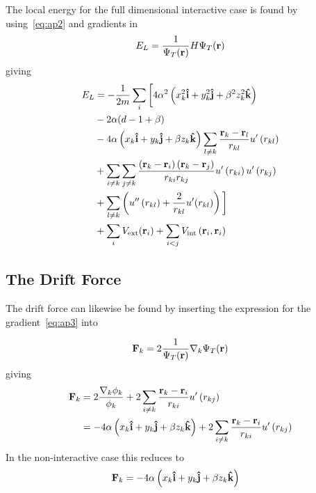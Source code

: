 The local energy for the full dimensional interactive case is found by
using~\eqref{eq:ap2} and gradients in
\begin{align*}
  E_{L} = \frac{1}{\Psi_T(\vb{r})}H\Psi_T(\vb{r})
\end{align*}
giving
\begin{align*}
  E_{L} &= -\frac{1}{2m}\sum_{i}\bigg[4\alpha^{2}\left(  x_{k}^{2}\uvec{i} + y_{k}^{2}\uvec{j} + \beta^{2} z_{k}^{2}\uvec{k}  \right)\\
          &-2\alpha(d-1+\beta)\\
        &- 4\alpha\left(  x_{k}\uvec{i} + y_{k}\uvec{j} + \beta z_{k}\uvec{k}  \right)
          \sum_{l\neq k} \frac{\vb{r}_{k}-\vb{r}_{l}}{r_{kl}}u^{\prime}\left( r_{kl} \right)\\
        &+ \sum_{i\neq k}\sum_{j\neq k}\frac{\left( \vb{r}_{k}-\vb{r}_{i} \right)\left( \vb{r}_{k} -\vb{r}_{j} \right)}{r_{ki}r_{kj}}u^{\prime}\left( r_{ki} \right)u^{\prime}\left( r_{kj} \right)\\
        &+ \sum_{l\neq k} \left( u^{\prime\prime}\left( r_{kl} \right)  + \frac{2}{r_{kl}}u^{\prime}(r_{kl})\right)\bigg]\\
        &+ \sum_{i}V_{\text{ext}}(\vb{r}_{i}) + \sum_{i<j}V_{\text{int}}\left( \vb{r}_{i}, \vb{r}_{i} \right)
\end{align*}
\subsection{The Drift Force}
The drift force can likewise be found by inserting the expression for the
gradient~\eqref{eq:ap3} into

\begin{align*}
  \vb{F}_{k} = 2\frac{1}{\Psi_T(\vb{r})}\nabla_{k}\Psi_T(\vb{r})
\end{align*}
giving
\begin{align*}
  \vb{F}_{k} &= 2 \frac{\nabla_{k}\phi_{k}}{\phi_{k}} + 2\sum_{i\neq k}\frac{\vb{r}_{k}-\vb{r}_{i}}{r_{ki}}u^{\prime}\left( r_{kj} \right)\\
             &= -4\alpha\left(   x_{k}\uvec{i} + y_{k}\uvec{j} + \beta z_{k}\uvec{k}   \right) + 2\sum_{i\neq k} \frac{\vb{r}_{k}-\vb{r}_{i}}{r_{ki}}u^{\prime}\left( r_{kj} \right)\\
\end{align*}
In the non-interactive case this reduces to
\begin{align*}
  \vb{F}_{k} &= -4\alpha\left(   x_{k}\uvec{i} + y_{k}\uvec{j} + \beta z_{k}\uvec{k}   \right)
\end{align*}



